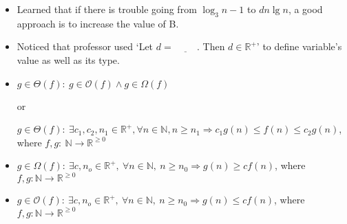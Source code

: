 \documentclass[12pt]{article}
\begin{document}
\bigskip

\begin{itemize}
    \item Learned that if there is trouble going from $\log_3n - 1$ to $dn\lg n$,
    a good approach is to increase the value of B.
    \item Noticed that professor used `Let $d = \underline{\hspace{1cm}}$. Then $d \in \mathbb{R}^+$'
    to define variable's value as well as its type.
    \item
    $g \in \Theta(f):\: g \in \mathcal{O}(f) \land g \in \Omega(f)$

    or

    $g \in \Theta(f):\:\exists c_1,c_2,n_1 \in \mathbb{R}^{+}, \forall n \in \mathbb{N}, n \geq n_1
    \Rightarrow c_1g(n) \leq f(n) \leq c_2g(n)$, where $f,g:\:\mathbb{N} \to \mathbb{R}^{\geq 0}$

    \item
    $g \in \Omega(f):\:\exists c,n_o \in \mathbb{R}^{+},\:\forall n \in
    \mathbb{N},\:n \geq n_0 \Rightarrow g(n) \geq cf(n)$, where $f,g:\mathbb{N} \to \mathbb{R}^{\geq 0}$

    \item

    $g \in \mathcal{O}(f):\:\exists c,n_o \in \mathbb{R}^{+},\:\forall n \in
    \mathbb{N},\:n \geq n_0 \Rightarrow g(n) \leq cf(n)$, where $f,g:\mathbb{N} \to \mathbb{R}^{\geq 0}$
\end{itemize}
\end{document}
